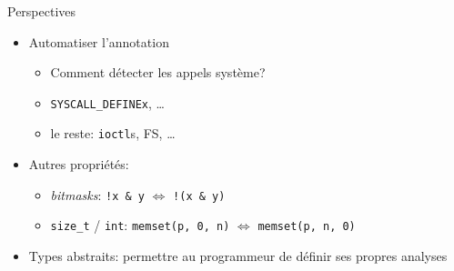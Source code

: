 \begin{frame}{Perspectives}
    \begin{itemize}
        \item Automatiser l'annotation
            \begin{itemize}
                \item Comment détecter les appels système?
                \item \texttt{SYSCALL\_DEFINEx}, …
                \item le reste: \texttt{ioctl}s, FS, …
            \end{itemize}
        \item Autres propriétés:
            \begin{itemize}
                \item \emph{bitmasks}: \texttt{!x \& y} $⇔$ \texttt{!(x \& y)}
                \item \texttt{size\_t} / \texttt{int}: \texttt{memset(p, 0, n)} $⇔$ \texttt{memset(p, n, 0)}
            \end{itemize}
        \item Types abstraits: permettre au programmeur de définir ses propres
            analyses
        \end{itemize}
\end{frame}
